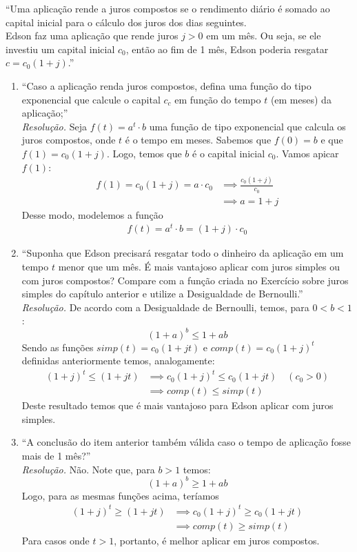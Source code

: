 \enquote{Uma aplicação rende a juros compostos se o rendimento diário é somado ao capital inicial para o cálculo dos juros dos dias seguintes. \\
Edson faz uma aplicação que rende juros $j > 0$ em um mês. Ou seja, se ele investiu um capital inicial $c_0$, então ao fim de 1 mês, Edson poderia resgatar $c = c_0(1 + j)$.}
\begin{enumerate}
    \item \enquote{Caso a aplicação renda juros compostos, defina uma função do tipo exponencial que calcule o capital $c_c$ em função do tempo $t$ (em meses) da aplicação;} \\ 
    \emph{Resolução.} Seja $f(t) = a^t \cdot b$ uma função de tipo exponencial que calcula os juros compostos, onde $t$ é o tempo em meses. Sabemos que $f(0) = b$ e que $f(1) = c_0(1 + j)$. Logo, temos que $b$ é o capital inicial $c_0$. Vamos apicar $f(1)$:
    \begin{align*}
        f(1) = c_0(1 + j) = a \cdot c_0 & \implies \frac{c_0(1 + j)}{c_0} \\ & \implies
        a = 1 + j
    \end{align*}
    Desse modo, modelemos a função
    \begin{align*}
        f(t) = a^t \cdot b = (1 + j) \cdot c_0
    \end{align*}
    \item \enquote{Suponha que Edson precisará resgatar todo o dinheiro da aplicação em um tempo $t$ menor que um mês. É mais vantajoso aplicar com juros simples ou com juros compostos? Compare com a função criada no Exercício sobre juros simples do capítulo anterior e utilize a Desigualdade de Bernoulli.} \\ 
    \emph{Resolução.} De acordo com a Desigualdade de Bernoulli, temos, para $0 < b < 1$:
    \begin{displaymath}
        (1 + a)^b \le 1 + ab
    \end{displaymath}
    Sendo as funções $simp(t) = c_0(1 + jt)$ e $comp(t) = c_0(1 + j)^t$ definidas anteriormente temos, analogamente:
    \begin{align*}
        (1 + j)^t \le (1 + jt) & \implies c_0(1 + j)^t \le c_0(1 + jt) \quad (c_0 > 0) \\ & \implies comp(t) \le simp(t)
    \end{align*}
    Deste resultado temos que é mais vantajoso para Edson aplicar com juros simples.
    \item \enquote{A conclusão do item anterior também válida caso o tempo de aplicação fosse mais de 1 mês?} \\ 
    \emph{Resolução.} Não. Note que, para $b > 1$ temos:
    \begin{displaymath}
        (1 + a)^b \ge 1 + ab
    \end{displaymath}
    Logo, para as mesmas funções acima, teríamos
    \begin{align*}
        (1 + j)^t \ge (1 + jt) & \implies c_0(1 + j)^t \ge c_0(1 + jt) \\ & \implies
        comp(t) \ge simp(t)
    \end{align*}
    Para casos onde $t > 1$, portanto, é melhor aplicar em juros compostos.
\end{enumerate}